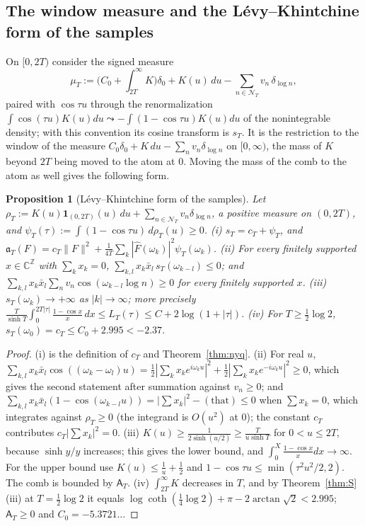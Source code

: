\documentclass[11pt]{amsart}
\newtheorem{proposition}[theorem]{Proposition}
\theoremstyle{definition}
\theoremstyle{remark}
\newcommand{\C}{\mathbb C}
\newcommand{\Z}{\mathbb Z}
\newcommand{\Fh}{\widehat F}
\newcommand{\NT}{\mathcal N_T}
\newcommand{\Aconst}{\mathsf A_T}
\begin{document}
\subsection{The window measure and the L\'evy--Khintchine form of the samples}
On $[0,2T)$ consider the signed measure
\[
\mu_T:=\Big(C_0+\int_{2T}^\infty K\Big)\delta_0+K(u)\,du-\sum_{n\in\NT}v_n\,\delta_{\log n},
\]
paired with $\cos\tau u$ through the renormalization $\int\cos(\tau u)K(u)du\leadsto-\int(1-\cos\tau u)K(u)du$ of
the nonintegrable density; with this convention its cosine transform is $s_T$. It is the restriction to the window
of the measure $C_0\delta_0+K\,du-\sum_nv_n\delta_{\log n}$ on $[0,\infty)$, the mass of $K$ beyond $2T$ being
moved to the atom at $0$. Moving the mass of the comb to the atom as well gives the following form.

\begin{proposition}[L\'evy--Khintchine form of the samples]\label{prop:nyq-LK}
Let $\rho_T:=K(u)\mathbf 1_{(0,2T)}(u)\,du+\sum_{n\in\NT}v_n\delta_{\log n}$, a positive measure on $(0,2T)$, and
$\psi_T(\tau):=\int(1-\cos\tau u)\,d\rho_T(u)\ge0$.
\emph{(i)} $s_T=c_T+\psi_T$, and $\mathfrak a_T(F)=c_T\|F\|^2+\frac1{4T}\sum_k|\Fh(\omega_k)|^2\psi_T(\omega_k)$.
\emph{(ii)} For every finitely supported $x\in\C^\Z$ with $\sum_kx_k=0$,
$\sum_{k,l}x_k\bar x_l\,s_T(\omega_{k-l})\le0$; and $\sum_{k,l}x_k\bar x_l\sum_nv_n\cos(\omega_{k-l}\log n)\ge0$ for every
finitely supported $x$.
\emph{(iii)} $s_T(\omega_k)\to+\infty$ as $|k|\to\infty$; more precisely
$\frac{T}{\sinh T}\int_0^{2T|\tau|}\frac{1-\cos x}x\,dx\le L_T(\tau)\le C+2\log(1+|\tau|)$.
\emph{(iv)} For $T\ge\frac12\log2$, $s_T(\omega_0)=c_T\le C_0+2.995<-2.37$.
\end{proposition}

\begin{proof}
(i) is the definition of $c_T$ and Theorem~\ref{thm:nyq}. (ii) For real $u$,
$\sum_{k,l}x_k\bar x_l\cos((\omega_k-\omega_l)u)=\frac12|\sum_kx_ke^{i\omega_ku}|^2+\frac12|\sum_kx_ke^{-i\omega_ku}|^2\ge0$,
which gives the second statement after summation against $v_n\ge0$; and
$\sum_{k,l}x_k\bar x_l(1-\cos(\omega_{k-l}u))=|\sum x_k|^2-(\text{that})\le0$ when $\sum x_k=0$, which integrates
against $\rho_T\ge0$ (the integrand is $O(u^2)$ at $0$); the constant $c_T$ contributes $c_T|\sum x_k|^2=0$.
(iii) $K(u)\ge\frac1{2\sinh(u/2)}\ge\frac{T}{u\sinh T}$ for $0<u\le2T$, because $\sinh y/y$ increases; this gives the
lower bound, and $\int_0^X\frac{1-\cos x}xdx\to\infty$. For the upper bound use $K(u)\le\frac1u+\frac12$ and
$1-\cos\tau u\le\min(\tau^2u^2/2,2)$. The comb is bounded by $\Aconst$. (iv) $\int_{2T}^\infty K$ decreases in $T$,
and by Theorem~\ref{thm:S}(iii) at $T=\frac12\log2$ it equals $\log\coth(\frac14\log2)+\pi-2\arctan\sqrt2<2.995$;
$\Aconst\ge0$ and $C_0=-5.3721\ldots$
\end{proof}
\end{document}

